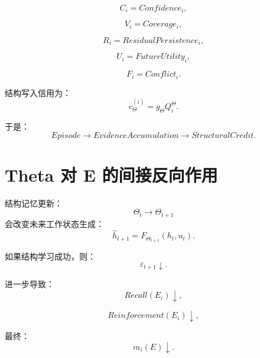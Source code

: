 \begin{equation}
C_i
=
Confidence_i,
\end{equation}

\begin{equation}
V_i
=
Coverage_i,
\end{equation}

\begin{equation}
R_i
=
ResidualPersistence_i,
\end{equation}

\begin{equation}
U_i
=
FutureUtility_i,
\end{equation}

\begin{equation}
F_i
=
Conflict_i.
\end{equation}

结构写入信用为：
\begin{equation}
c_\Theta^{(i)}
=
g_\Theta
Q_i^\Theta.
\end{equation}

于是：
\begin{equation}
\boxed{
Episode
\rightarrow
EvidenceAccumulation
\rightarrow
StructuralCredit.
}
\end{equation}


\section{Theta 对 E 的间接反向作用}

结构记忆更新：
\begin{equation}
\Theta_t
\rightarrow
\Theta_{t+1}
\end{equation}
会改变未来工作状态生成：
\begin{equation}
\hat h_{t+1}
=
F_{\Theta_{t+1}}(h_t,u_t).
\end{equation}

如果结构学习成功，则：
\begin{equation}
\varepsilon_{t+1}\downarrow.
\end{equation}

进一步导致：
\begin{equation}
Recall(E_i)\downarrow,
\end{equation}

\begin{equation}
Reinforcement(E_i)\downarrow,
\end{equation}

最终：
\begin{equation}
m_i(E)\downarrow.
\end{equation}

